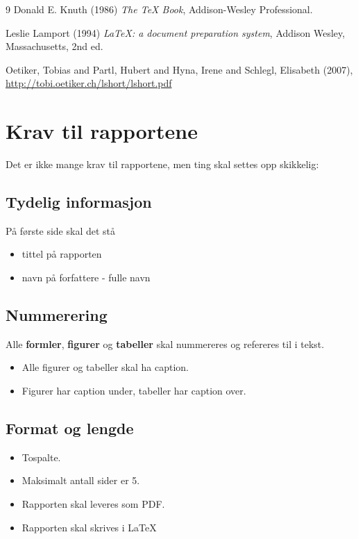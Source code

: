\documentclass[11pt,a4paper,twocolumn]{article}
\begin{document}
\begin{thebibliography}{9}
Donald E. Knuth (1986) \emph{The \TeX{} Book}, Addison-Wesley Professional.

Leslie Lamport (1994) \emph{\LaTeX: a document preparation system}, Addison
Wesley, Massachusetts, 2nd ed.

{Oetiker, Tobias and Partl, Hubert and Hyna, Irene and Schlegl, Elisabeth} (2007), \url{http://tobi.oetiker.ch/lshort/lshort.pdf}

\end{thebibliography}

\clearpage
\appendix
\section{Krav til rapportene}\label{app:krav}
Det er ikke mange krav til rapportene, men ting skal settes opp skikkelig:
\subsection{Tydelig informasjon}
På første side skal det stå
  \begin{itemize}
    \item tittel på rapporten
    \item navn på forfattere - fulle navn
  \end{itemize} 
\subsection{Nummerering}
Alle \textbf{formler}, \textbf{figurer} og \textbf{tabeller} skal nummereres og refereres til i tekst.
\begin{itemize}
  \item Alle figurer og tabeller skal ha caption.
  \item Figurer har caption under, tabeller har caption over.
\end{itemize}
\subsection{Format og lengde}
\begin{itemize}
  \item Tospalte.
  \item Maksimalt antall sider er 5.
  \item Rapporten skal leveres som PDF.
  \item Rapporten skal skrives i \LaTeX
\end{itemize} 
\end{document}
